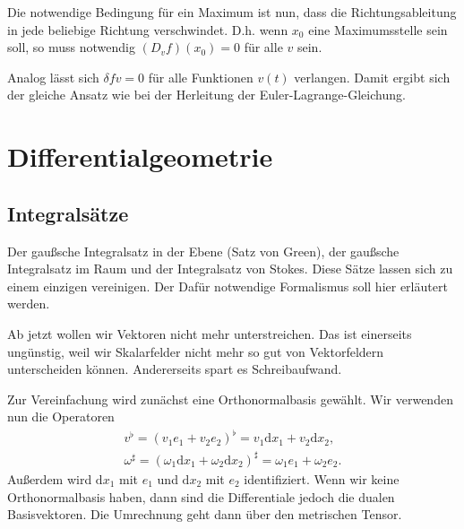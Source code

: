 \documentclass[a4paper,10pt,fleqn,twocolumn,twoside]{article}
\begin{document}
Die notwendige Bedingung für ein Maximum ist nun, dass die
Richtungsableitung in jede beliebige Richtung verschwindet. D.h.
wenn \(x_0\) eine Maximumsstelle sein soll, so muss notwendig
\((D_v f)(x_0)=0\) für alle \(v\) sein.

Analog lässt sich
\(\delta fv=0\) für alle Funktionen \(v(t)\) verlangen.
Damit ergibt sich der gleiche Ansatz wie bei der Herleitung
der Euler-Lagrange-Gleichung.


\newpage
\section{Differentialgeometrie}

\subsection{Integralsätze}

Der gaußsche Integralsatz in der Ebene (Satz von Green), der gaußsche
Integralsatz im Raum und der Integralsatz von Stokes. Diese
Sätze lassen sich zu einem einzigen vereinigen. Der Dafür notwendige
Formalismus soll hier erläutert werden.

Ab jetzt wollen wir Vektoren nicht mehr unterstreichen. Das ist
einerseits ungünstig, weil wir Skalarfelder nicht mehr so gut von
Vektorfeldern unterscheiden können. Andererseits spart es
Schreibaufwand.

Zur Vereinfachung wird zunächst eine Orthonormalbasis gewählt.
Wir verwenden nun die Operatoren
\begin{gather*}
v^\flat = (v_1e_1+v_2e_2)^\flat
= v_1\mathrm dx_1+v_2\mathrm dx_2,\\
\omega^\sharp
= (\omega_1\mathrm dx_1+\omega_2\mathrm dx_2)^\sharp
= \omega_1e_1+\omega_2e_2.
\end{gather*}
Außerdem wird \(\mathrm dx_1\) mit \(e_1\) und \(\mathrm dx_2\)
mit \(e_2\) identifiziert. Wenn wir keine Orthonormalbasis haben,
dann sind die Differentiale jedoch die dualen Basisvektoren.
Die Umrechnung geht dann über den metrischen Tensor.
\end{document}
